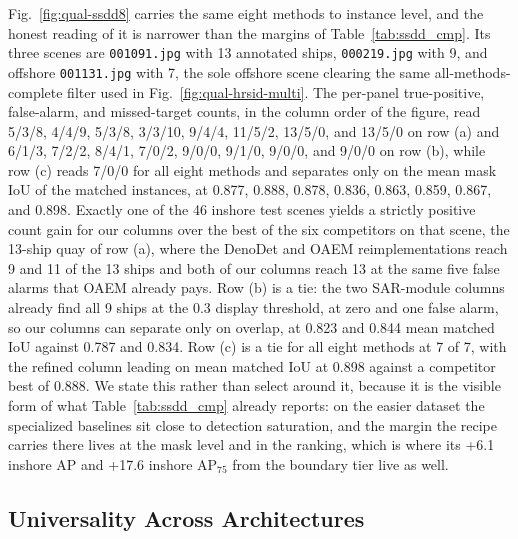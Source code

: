 Fig.~\ref{fig:qual-ssdd8} carries the same eight methods to instance level, and the honest reading of it is narrower than the margins of Table~\ref{tab:ssdd_cmp}. Its three scenes are \texttt{001091.jpg} with 13 annotated ships, \texttt{000219.jpg} with 9, and offshore \texttt{001131.jpg} with 7, the sole offshore scene clearing the same all-methods-complete filter used in Fig.~\ref{fig:qual-hrsid-multi}. The per-panel true-positive, false-alarm, and missed-target counts, in the column order of the figure, read 5/3/8, 4/4/9, 5/3/8, 3/3/10, 9/4/4, 11/5/2, 13/5/0, and 13/5/0 on row (a) and 6/1/3, 7/2/2, 8/4/1, 7/0/2, 9/0/0, 9/1/0, 9/0/0, and 9/0/0 on row (b), while row (c) reads 7/0/0 for all eight methods and separates only on the mean mask IoU of the matched instances, at 0.877, 0.888, 0.878, 0.836, 0.863, 0.859, 0.867, and 0.898. Exactly one of the 46 inshore test scenes yields a strictly positive count gain for our columns over the best of the six competitors on that scene, the 13-ship quay of row (a), where the DenoDet and OAEM reimplementations reach 9 and 11 of the 13 ships and both of our columns reach 13 at the same five false alarms that OAEM already pays. Row (b) is a tie: the two SAR-module columns already find all 9 ships at the 0.3 display threshold, at zero and one false alarm, so our columns can separate only on overlap, at 0.823 and 0.844 mean matched IoU against 0.787 and 0.834. Row (c) is a tie for all eight methods at 7 of 7, with the refined column leading on mean matched IoU at 0.898 against a competitor best of 0.888. We state this rather than select around it, because it is the visible form of what Table~\ref{tab:ssdd_cmp} already reports: on the easier dataset the specialized baselines sit close to detection saturation, and the margin the recipe carries there lives at the mask level and in the ranking, which is where its +6.1 inshore AP and +17.6 inshore AP$_{75}$ from the boundary tier live as well.

\subsection{Universality Across Architectures}\label{sec:exp:univ}

